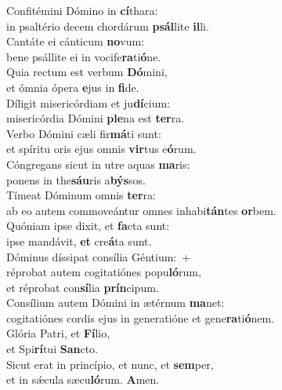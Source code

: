 \evenverse Confitémini Dómino in \textbf{cí}thara:~\*\\
\evenverse in psaltério decem chordárum \textbf{psál}lite \textbf{il}li.\\
\oddverse Cantáte ei cánticum \textbf{no}vum:~\*\\
\oddverse bene psállite ei in vocife\textbf{ra}ti\textbf{ó}ne.\\
\evenverse Quia rectum est verbum \textbf{Dó}mini,~\*\\
\evenverse et ómnia ópera \textbf{e}jus in \textbf{fi}de.\\
\oddverse Díligit misericórdiam et ju\textbf{dí}cium:~\*\\
\oddverse misericórdia Dómini \textbf{ple}na est \textbf{ter}ra.\\
\evenverse Verbo Dómini cæli fir\textbf{má}ti sunt:~\*\\
\evenverse et spíritu oris ejus omnis \textbf{vir}tus e\textbf{ó}rum.\\
\oddverse Cóngregans sicut in utre aquas \textbf{ma}ris:~\*\\
\oddverse ponens in the\textbf{sáu}ris a\textbf{býs}sos.\\
\evenverse Tímeat Dóminum omnis \textbf{ter}ra:~\*\\
\evenverse ab eo autem commoveántur omnes inhabi\textbf{tán}tes \textbf{or}bem.\\
\oddverse Quóniam ipse dixit, et \textbf{fa}cta sunt:~\*\\
\oddverse ipse mandávit, \textbf{et} cre\textbf{á}ta sunt.\\
\evenverse Dóminus díssipat consília Géntium:~+\\
\evenverse  réprobat autem cogitatiónes popu\textbf{ló}rum,~\*\\
\evenverse et réprobat con\textbf{sí}lia \textbf{prín}cipum.\\
\oddverse Consílium autem Dómini in ætérnum \textbf{ma}net:~\*\\
\oddverse cogitatiónes cordis ejus in generatióne et gene\textbf{ra}ti\textbf{ó}nem.\\
\evenverse Glória Patri, et \textbf{Fí}lio,~\*\\
\evenverse et Spi\textbf{rí}tui \textbf{San}cto.\\
\oddverse Sicut erat in princípio, et nunc, et \textbf{sem}per,~\*\\
\oddverse et in sǽcula sæcu\textbf{ló}rum. \textbf{A}men.\\

